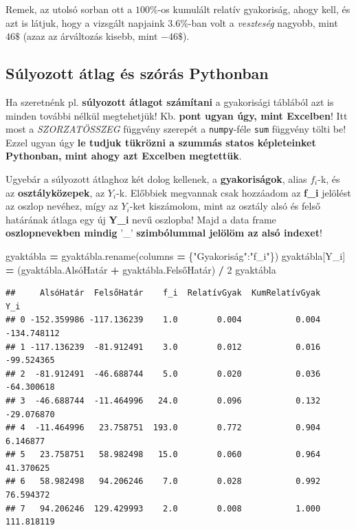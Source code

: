 \documentclass[
]{book}
\newenvironment{Shaded}{\begin{snugshade}}{\end{snugshade}}
\newcommand{\DecValTok}[1]{\textcolor[rgb]{0.00,0.00,0.81}{#1}}
\newcommand{\NormalTok}[1]{#1}
\newcommand{\OperatorTok}[1]{\textcolor[rgb]{0.81,0.36,0.00}{\textbf{#1}}}
\newcommand{\StringTok}[1]{\textcolor[rgb]{0.31,0.60,0.02}{#1}}
\begin{document}
Remek, az utolsó sorban ott a \(100\%\)-os kumulált relatív gyakoriság, ahogy kell, és azt is látjuk, hogy a vizsgált napjaink \(3.6\%\)-ban volt a \emph{veszteség} nagyobb, mint \(46\$\) (azaz az árváltozás kisebb, mint \(-46\$\)).

\subsection{Súlyozott átlag és szórás Pythonban}\label{suxfalyozott-uxe1tlag-uxe9s-szuxf3ruxe1s-pythonban}

Ha szeretnénk pl. \textbf{súlyozott átlagot számítani} a gyakorisági táblából azt is minden további nélkül megtehetjük! Kb. \textbf{pont ugyan úgy, mint Excelben}! Itt most a \emph{SZORZATÖSSZEG} függvény szerepét a \texttt{numpy}-féle \texttt{sum} függvény tölti be! Ezzel ugyan úgy \textbf{le tudjuk tükrözni a szummás statos képleteinket Pythonban, mint ahogy azt Excelben megtettük}.

Ugyebár a súlyozott átlaghoz két dolog kellenek, a \textbf{gyakoriságok}, alias \(f_i\)-k, és az \textbf{osztályközepek}, az \(Y_i\)-k. Előbbiek megvannak csak hozzáadom az \textbf{f\_i} jelölést az oszlop nevéhez, mígy az \(Y_i\)-ket kiszámolom, mint az osztály alsó és felső határának átlaga egy új \textbf{Y\_i} nevű oszlopba! Majd a data frame \textbf{oszlopnevekben mindig} '\_' \textbf{szimbólummal jelölöm az alsó indexet}!

\begin{Shaded}
\begin{Highlighting}[]
\NormalTok{gyaktábla }\OperatorTok{=}\NormalTok{ gyaktábla.rename(columns }\OperatorTok{=}\NormalTok{ \{}\StringTok{"Gyakoriság"}\NormalTok{:}\StringTok{"f\_i"}\NormalTok{\})}
\NormalTok{gyaktábla[}\StringTok{\textquotesingle{}Y\_i\textquotesingle{}}\NormalTok{] }\OperatorTok{=}\NormalTok{ (gyaktábla.AlsóHatár }\OperatorTok{+}\NormalTok{ gyaktábla.FelsőHatár) }\OperatorTok{/} \DecValTok{2}
\NormalTok{gyaktábla}
\end{Highlighting}
\end{Shaded}

\begin{verbatim}
##     AlsóHatár  FelsőHatár    f_i  RelatívGyak  KumRelatívGyak         Y_i
## 0 -152.359986 -117.136239    1.0        0.004           0.004 -134.748112
## 1 -117.136239  -81.912491    3.0        0.012           0.016  -99.524365
## 2  -81.912491  -46.688744    5.0        0.020           0.036  -64.300618
## 3  -46.688744  -11.464996   24.0        0.096           0.132  -29.076870
## 4  -11.464996   23.758751  193.0        0.772           0.904    6.146877
## 5   23.758751   58.982498   15.0        0.060           0.964   41.370625
## 6   58.982498   94.206246    7.0        0.028           0.992   76.594372
## 7   94.206246  129.429993    2.0        0.008           1.000  111.818119
\end{verbatim}
\end{document}

